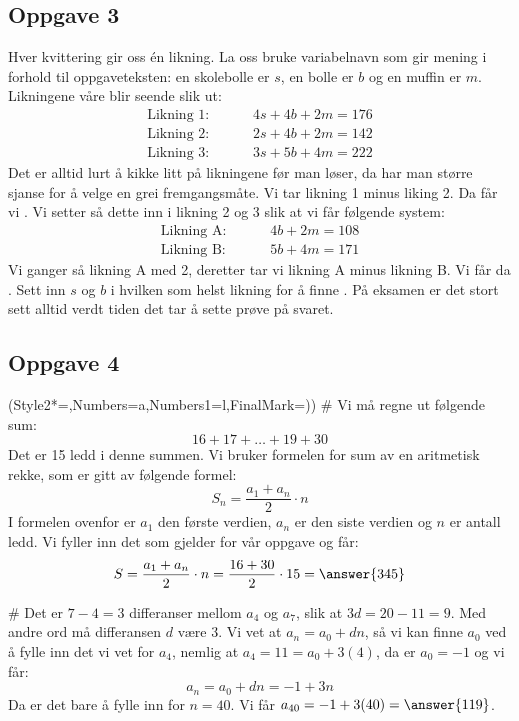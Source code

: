 \subsection*{Oppgave 3}
Hver kvittering gir oss én likning. La oss bruke variabelnavn som gir mening i forhold til oppgaveteksten: en skolebolle er $s$, en bolle er $b$ og en muffin er $m$. Likningene våre blir seende slik ut:
\begin{align*}
	\text{Likning 1:   }\qquad& 4s + 4b +2m = 176 \\
	\text{Likning 2:   }\qquad& 2s + 4b +2m = 142 \\
	\text{Likning 3:   }\qquad& 3s + 5b +4m = 222 
\end{align*}
Det er alltid lurt å kikke litt på likningene før man løser, da har man større sjanse for å velge en grei fremgangsmåte.
Vi tar likning 1 minus liking 2. Da får vi . Vi setter så dette inn i likning 2 og 3 slik at vi får følgende system:
\begin{align*}
\text{Likning A:   }\qquad& 4b +2m = 108 \\
\text{Likning B:   }\qquad& 5b + 4m = 171 
\end{align*}
Vi ganger så likning A med 2, deretter tar vi likning A minus likning B. Vi får da . Sett inn $s$ og $b$ i hvilken som helst likning for å finne . På eksamen er det stort sett alltid verdt tiden det tar å sette prøve på svaret.

\subsection*{Oppgave 4}
\begin{easylist}[enumerate]
	\ListProperties(Style2*=,Numbers=a,Numbers1=l,FinalMark={)})
	# Vi må regne ut følgende sum:
	\begin{equation*}
		16 + 17 + \dots + 19 + 30
	\end{equation*}
	Det er 15 ledd i denne summen. Vi bruker formelen for sum av en aritmetisk rekke, som er gitt av følgende formel:
	\begin{equation}
	\label{eqn:arit}
		S_n = \frac{a_1 + a_n}{2} \cdot n
	\end{equation}
	I formelen ovenfor er $a_1$ den første verdien, $a_n$ er den siste verdien og $n$ er antall ledd. Vi fyller inn det som gjelder for vår oppgave og får:
	\begin{equation*}
	S = \frac{a_1 + a_n}{2} \cdot n = \frac{16 + 30}{2} \cdot 15 = \answer{345}
	\end{equation*}
	
	# Det er $7-4 = 3$ differanser mellom $a_4$ og $a_7$, slik at $3d = 20-11 = 9$.
	Med andre ord må differansen $d$ være $3$. Vi vet at $a_n = a_0 + dn$, så vi kan finne $a_0$ ved å fylle inn det vi vet for $a_4$, nemlig at $a_4 = 11 = a_0 + 3(4)$, da er $a_0 = -1$ og vi får:
	\begin{equation*}
		a_n = a_0 + dn = -1 + 3n
	\end{equation*}
	Da er det bare å fylle inn for $n = 40$. Vi får $a_{40} = -1 + 3(40) = \answer{119}$.
\end{easylist}

